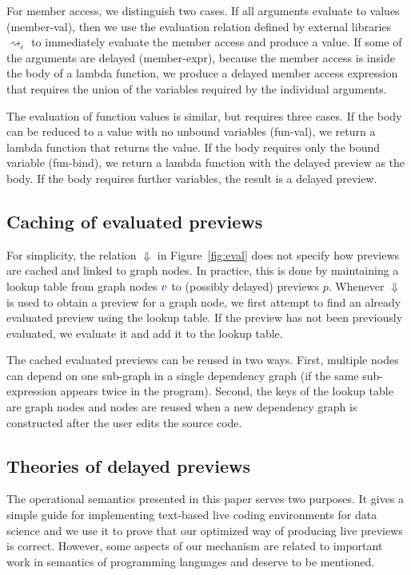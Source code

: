 \documentclass[acmsmall,anonymous,fleqn]{acmart}\settopmatter{printfolios=false,printccs=false,printacmref=false}
\theoremstyle{plain}
\theoremstyle{definition}
\newcommand{\bndclr}[1]{\textcolor{kvdclr}{#1}}
\newcommand{\rname}[1]{{\sffamily\small(#1)}}
\begin{document}
For member access, we distinguish two cases. If all arguments evaluate to values \rname{member-val},
then we use the evaluation relation defined by external libraries $\rightsquigarrow_\epsilon$ to
immediately evaluate the member access and produce a value. If some of the arguments are
delayed \rname{member-expr}, because the member access is inside the body of a lambda function,
we produce a delayed member access expression that requires the union of the variables
required by the individual arguments.

The evaluation of function values is similar, but requires three cases. If the body can
be reduced to a value with no unbound variables \rname{fun-val}, we return a lambda function that
returns the value. If the body requires only the bound variable \rname{fun-bind}, we return a
lambda function with the delayed preview as the body. If the body requires further variables,
the result is a delayed preview.

\subsection{Caching of evaluated previews}
\label{sec:previews-cache}

For simplicity, the relation $\Downarrow$ in Figure~\ref{fig:eval} does not specify how previews
are cached and linked to graph nodes. In practice, this is done by maintaining a lookup table
from graph nodes $\bndclr{v}$ to (possibly delayed) previews $p$.
Whenever $\Downarrow$ is used to obtain a preview for a graph node, we first
attempt to find an already evaluated preview using the lookup table. If the preview has not
been previously evaluated, we evaluate it and add it to the lookup table.

The cached evaluated previews can be reused in two ways. First, multiple nodes can
depend on one sub-graph in a single dependency graph (if the same sub-expression appears
twice in the program). Second, the keys of the lookup table are graph nodes and nodes are
reused when a new dependency graph is constructed after the user edits the source code.

\subsection{Theories of delayed previews}
The operational semantics presented in this paper serves two purposes. It gives a simple guide
for implementing text-based live coding environments for data science and we use it to prove that
our optimized way of producing live previews is correct. However, some aspects of our mechanism
are related to important work in semantics of programming languages and deserve to be mentioned.
\end{document}
